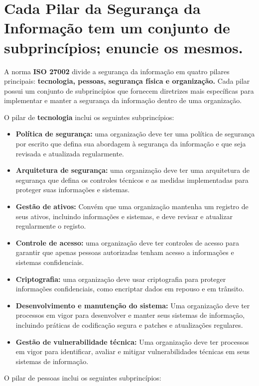 \section[Pergunta 3]{Cada Pilar da Segurança da Informação tem um conjunto de subprincípios; enuncie os mesmos.}

A norma \textbf{ISO 27002} divide a segurança da informação em quatro pilares principais: \textbf{tecnologia, pessoas, segurança física e organização.} Cada pilar possui um conjunto de subprincípios que fornecem diretrizes mais específicas para implementar e manter a segurança da informação dentro de uma organização.

O pilar de \textbf{tecnologia} inclui os seguintes subprincípios:

\begin{itemize}
  \item \textbf{Política de segurança: }uma organização deve ter uma política de segurança por escrito que defina sua abordagem à segurança da informação e que seja revisada e atualizada regularmente.
  \item \textbf{Arquitetura de segurança: }uma organização deve ter uma arquitetura de segurança que defina os controles técnicos e as medidas implementadas para proteger suas informações e sistemas.
  \item \textbf{Gestão de ativos: }Convém que uma organização mantenha um registro de seus ativos, incluindo informações e sistemas, e deve revisar e atualizar regularmente o registo.
  \item \textbf{Controle de acesso: }uma organização deve ter controles de acesso para garantir que apenas pessoas autorizadas tenham acesso a informações e sistemas confidenciais.
  \item \textbf{Criptografia: }uma organização deve usar criptografia para proteger informações confidenciais, como encriptar dados em repouso e em trânsito.
  \item \textbf{Desenvolvimento e manutenção do sistema: }Uma organização deve ter processos em vigor para desenvolver e manter seus sistemas de informação, incluindo práticas de codificação segura e patches e atualizações regulares.
  \item \textbf{Gestão de vulnerabilidade técnica: }Uma organização deve ter processos em vigor para identificar, avaliar e mitigar vulnerabilidades técnicas em seus sistemas de informação.
\end{itemize}

O pilar de pessoas inclui os seguintes subprincípios:

